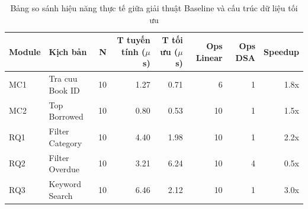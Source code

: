 \begin{table}[H]
\centering
\small
\begin{tabular}{|l|l|r|r|r|r|r|r|}
\hline
\textbf{Module} & \textbf{Kịch bản} & \textbf{N} & \textbf{T tuyến tính ($\mu$s)} & \textbf{T tối ưu ($\mu$s)} & \textbf{Ops Linear} & \textbf{Ops DSA} & \textbf{Speedup} \\
\hline
MC1 & Tra cuu Book ID & 10 & 1.27 & 0.71 & 6 & 1 & 1.8x \\
\hline
MC2 & Top Borrowed & 10 & 0.80 & 0.53 & 10 & 1 & 1.5x \\
\hline
RQ1 & Filter Category & 10 & 4.40 & 1.98 & 10 & 1 & 2.2x \\
\hline
RQ2 & Filter Overdue & 10 & 3.21 & 6.24 & 10 & 4 & 0.5x \\
\hline
RQ3 & Keyword Search & 10 & 6.46 & 2.12 & 10 & 1 & 3.0x \\
\hline
\end{tabular}
\caption{Bảng so sánh hiệu năng thực tế giữa giải thuật Baseline và cấu trúc dữ liệu tối ưu}
\label{tab:benchmark_results}
\end{table}
